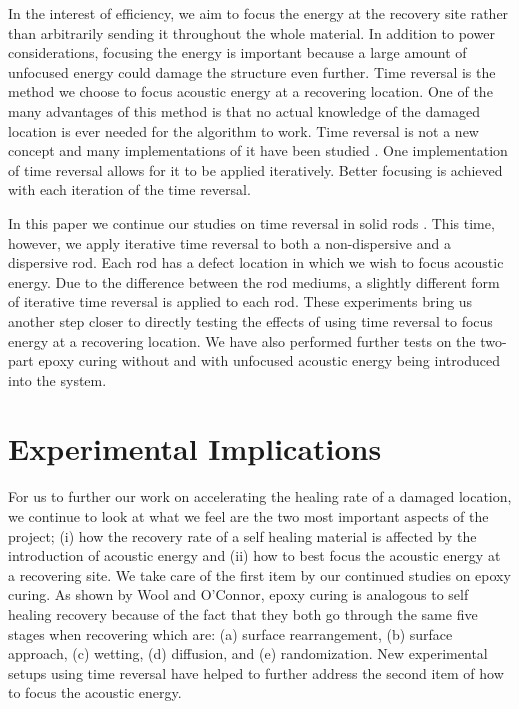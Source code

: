 \documentclass[]{aiaa-tc}%
\begin{document}
In the interest of efficiency, we aim to focus the energy at the recovery site rather than arbitrarily sending it throughout the whole material. In addition to power considerations, focusing the energy is important because a large amount of unfocused energy could damage the structure even further. Time reversal is the method we choose to focus acoustic energy at a recovering location. One of the many advantages of this method is that no actual knowledge of the damaged location is ever needed for the algorithm to work. Time reversal is not a new concept and many implementations of it have been studied \cite{ Anderson2008, Borcea2003, Fink2009, Sutin2004, Harley2009}.  One implementation of time reversal allows for it to be applied iteratively. Better focusing is achieved with each iteration of the time reversal. 

In this paper we continue our studies on time reversal in solid rods \cite{AIAASelfHeal2011}. This time, however, we apply iterative time reversal to both a non-dispersive and a dispersive rod. Each rod has a defect location in which we wish to focus acoustic energy. Due to the difference between the rod mediums, a slightly different form of iterative time reversal is applied to each rod. These experiments bring us another step closer to directly testing the effects of using time reversal to focus energy at a recovering location. We have also performed further tests on the two-part epoxy curing without and with unfocused acoustic energy being introduced into the system.

\section{Experimental Implications}

For us to further our work on accelerating the healing rate of a damaged location, we continue to look at what we feel are the two most important aspects of the project; (i) how the recovery rate of a self healing material is affected by the introduction of acoustic energy and (ii) how to best focus the acoustic energy at a recovering site. We take care of the first item by our continued studies on epoxy curing. As shown by Wool and O'Connor, epoxy curing is analogous to self healing recovery because of the fact that they both go through the same five stages when recovering which are: (a) surface rearrangement, (b) surface approach, (c) wetting, (d) diffusion, and (e) randomization. New experimental setups using time reversal have helped to further address the second item of how to focus the acoustic energy.
\end{document}
